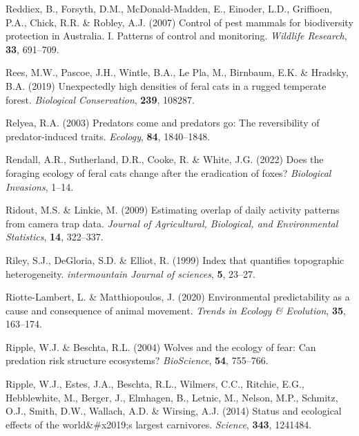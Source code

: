 \documentclass[11pt,a4paper,titlepage,twoside,openright]{style/unimelbthesis}
\begin{document}
\begin{mainmatter}
\leavevmode\hypertarget{ref-reddiex2007control}{}%
Reddiex, B., Forsyth, D.M., McDonald-Madden, E., Einoder, L.D., Griffioen, P.A., Chick, R.R. \& Robley, A.J. (2007) Control of pest mammals for biodiversity protection in Australia. I. Patterns of control and monitoring. \emph{Wildlife Research}, \textbf{33}, 691--709.

\leavevmode\hypertarget{ref-rees2019unexpectedly}{}%
Rees, M.W., Pascoe, J.H., Wintle, B.A., Le Pla, M., Birnbaum, E.K. \& Hradsky, B.A. (2019) Unexpectedly high densities of feral cats in a rugged temperate forest. \emph{Biological Conservation}, \textbf{239}, 108287.

\leavevmode\hypertarget{ref-relyea2003predators}{}%
Relyea, R.A. (2003) Predators come and predators go: The reversibility of predator-induced traits. \emph{Ecology}, \textbf{84}, 1840--1848.

\leavevmode\hypertarget{ref-rendall2022does}{}%
Rendall, A.R., Sutherland, D.R., Cooke, R. \& White, J.G. (2022) Does the foraging ecology of feral cats change after the eradication of foxes? \emph{Biological Invasions}, 1--14.

\leavevmode\hypertarget{ref-ridout2009estimating}{}%
Ridout, M.S. \& Linkie, M. (2009) Estimating overlap of daily activity patterns from camera trap data. \emph{Journal of Agricultural, Biological, and Environmental Statistics}, \textbf{14}, 322--337.

\leavevmode\hypertarget{ref-riley1999index}{}%
Riley, S.J., DeGloria, S.D. \& Elliot, R. (1999) Index that quantifies topographic heterogeneity. \emph{intermountain Journal of sciences}, \textbf{5}, 23--27.

\leavevmode\hypertarget{ref-riotte-lambert2020environmental}{}%
Riotte-Lambert, L. \& Matthiopoulos, J. (2020) Environmental predictability as a cause and consequence of animal movement. \emph{Trends in Ecology \& Evolution}, \textbf{35}, 163--174.

\leavevmode\hypertarget{ref-ripple2004wolves}{}%
Ripple, W.J. \& Beschta, R.L. (2004) Wolves and the ecology of fear: Can predation risk structure ecosystems? \emph{BioScience}, \textbf{54}, 755--766.

\leavevmode\hypertarget{ref-ripple2014status}{}%
Ripple, W.J., Estes, J.A., Beschta, R.L., Wilmers, C.C., Ritchie, E.G., Hebblewhite, M., Berger, J., Elmhagen, B., Letnic, M., Nelson, M.P., Schmitz, O.J., Smith, D.W., Wallach, A.D. \& Wirsing, A.J. (2014) Status and ecological effects of the world\&\#x2019;s largest carnivores. \emph{Science}, \textbf{343}, 1241484.


\end{mainmatter}
\end{document}
